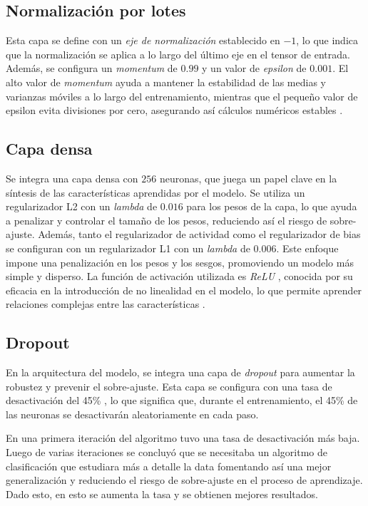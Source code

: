    \subsection{Normalización por lotes}
   
   Esta capa se define con un \textit{eje de normalización} establecido en $-1$, lo que indica que la normalización se aplica a lo largo del último eje en el tensor de entrada. Además, se configura un \textit{momentum} de $0.99$ y un valor de \textit{epsilon} de $0.001$. El alto valor de \textit{momentum} ayuda a mantener la estabilidad de las medias y varianzas móviles a lo largo del entrenamiento, mientras que el pequeño valor de epsilon evita divisiones por cero, asegurando así cálculos numéricos estables .
   
   \subsection{Capa densa}
   
   Se integra una capa densa con $256$ neuronas, que juega un papel clave en la síntesis de las características aprendidas por el modelo. Se utiliza un regularizador L2 con un \textit{lambda} de $0.016$ para los pesos de la capa, lo que ayuda a penalizar y controlar el tamaño de los pesos, reduciendo así el riesgo de sobre-ajuste. Además, tanto el regularizador de actividad como el regularizador de bias se configuran con un regularizador L1 con un \textit{lambda} de $0.006$. Este enfoque impone una penalización en los pesos y los sesgos, promoviendo un modelo más simple y disperso. La función de activación utilizada es \textit{ReLU} , conocida por su eficacia en la introducción de no linealidad en el modelo, lo que permite aprender relaciones complejas entre las características .
   
   \subsection{Dropout}
   
   En la arquitectura del modelo, se integra una capa de \textit{dropout} para aumentar la robustez y prevenir el sobre-ajuste. Esta capa se configura con una tasa de desactivación del 45\% , lo que significa que, durante el entrenamiento, el 45\% de las neuronas se desactivarán aleatoriamente en cada paso. 
   
   En una primera iteración del algoritmo tuvo una tasa de desactivación más baja. Luego de varias iteraciones se concluyó que se necesitaba un algoritmo de clasificación que estudiara más a detalle la data fomentando así una mejor generalización y reduciendo el riesgo de sobre-ajuste en el proceso de aprendizaje. Dado esto, en esto se aumenta la tasa y se obtienen mejores resultados.
   
